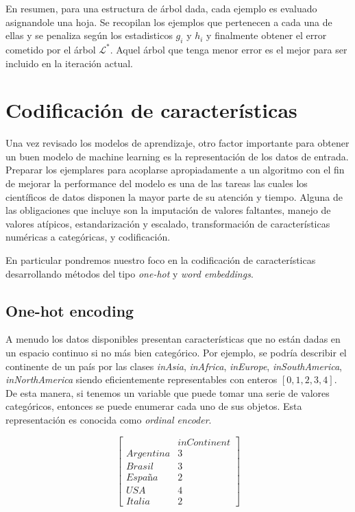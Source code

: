 En resumen, para una estructura de árbol dada, cada ejemplo es evaluado
asignandole una hoja. Se recopilan los ejemplos que pertenecen a cada una de
ellas y se penaliza según los estadisticos $g_i$ y $h_i$ y finalmente obtener el
error cometido por el árbol $\mathcal{L^{*}}$. Aquel árbol que tenga menor error
es el mejor para ser incluido en la iteración actual.

\section{Codificación de características}

Una vez revisado los modelos de aprendizaje, otro factor importante para obtener un buen modelo de machine learning es la representación de los datos de entrada. Preparar los ejemplares para acoplarse apropiadamente a un algoritmo con el fin de mejorar la performance del modelo es una de las tareas las cuales los
científicos de datos disponen la mayor parte de su atención y tiempo. Alguna de
las obligaciones que incluye son la imputación de valores faltantes, manejo de
valores atípicos, estandarización y escalado, transformación de características
numéricas a categóricas, y codificación.

En particular pondremos nuestro foco en la codificación de características
desarrollando métodos del tipo \emph{one-hot} y \emph{word embeddings}.

\subsection{One-hot encoding}

A menudo los datos disponibles presentan características que no están dadas en
un espacio continuo si no más bien categórico. Por ejemplo, se podría describir
el continente de un país por las clases \emph{inAsia}, \emph{inAfrica},
\emph{inEurope}, \emph{inSouthAmerica}, \emph{inNorthAmerica} siendo
eficientemente representables con enteros $[0, 1, 2, 3, 4]$. De esta manera, si
tenemos un variable que puede tomar una serie de valores categóricos, entonces se puede enumerar cada uno de sus objetos. Esta representación es conocida como \emph{ordinal encoder}.

\begin{equation*}
    \begin{bmatrix}
         & inContinent\\
        Argentina & 3 \\
        Brasil & 3 \\
        España & 2 \\
        USA & 4  \\
        Italia & 2 
    \end{bmatrix}
\end{equation*}

